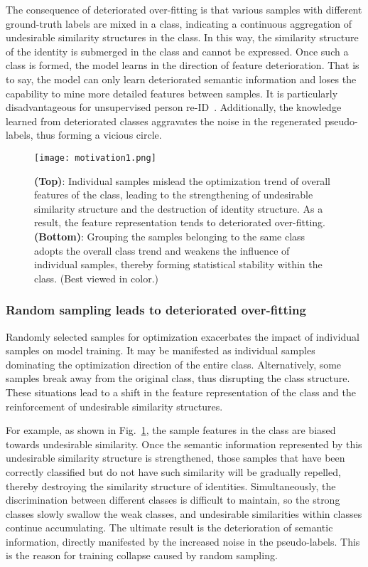 \documentclass[lettersize,journal]{IEEEtran}
\begin{document}
The consequence of deteriorated over-fitting is that various samples with different ground-truth labels are mixed in a class, indicating a continuous aggregation of undesirable similarity structures in the class. In this way, the similarity structure of the identity is submerged in the class and cannot be expressed.
Once such a class is formed, the model learns in the direction of feature deterioration. That is to say, the model can only learn deteriorated semantic information and loses the capability to mine more detailed features between samples. It is particularly disadvantageous for unsupervised person re-ID~\cite{reid-survey1}. Additionally, the knowledge learned from deteriorated classes aggravates the noise in the regenerated pseudo-labels, thus forming a vicious circle.

\begin{figure}[t]
\begin{center}
\texttt{[image: motivation1.png]}
\end{center}
   \caption{\textbf{(Top)}: Individual samples mislead the optimization trend of overall features of the class, leading to the strengthening of undesirable similarity structure and the destruction of identity structure. As a result, the feature representation tends to deteriorated over-fitting. \textbf{(Bottom)}: Grouping the samples belonging to the same class adopts the overall class trend and weakens the influence of individual samples, thereby forming statistical stability within the class. (Best viewed in color.)} 
\label{fig:motivation}
\end{figure}

\subsubsection{Random sampling leads to deteriorated over-fitting}
Randomly selected samples for optimization exacerbates the impact of individual samples on model training. 
It may be manifested as individual samples dominating the optimization direction of the entire class.
Alternatively, some samples break away from the original class, thus disrupting the class structure.
These situations lead to a shift in the feature representation of the class and the reinforcement of undesirable similarity structures. 

For example, as shown in Fig.~\ref{fig:motivation}, the sample features in the class are biased towards undesirable similarity. Once the semantic information represented by this undesirable similarity structure is strengthened, those samples that have been correctly classified but do not have such similarity will be gradually repelled, thereby destroying the similarity structure of identities. Simultaneously, the discrimination between different classes is difficult to maintain, so the strong classes slowly swallow the weak classes, and undesirable similarities within classes continue accumulating.
The ultimate result is the deterioration of semantic information, directly manifested by the increased noise in the pseudo-labels. This is the reason for training collapse caused by random sampling. 
\end{document}
